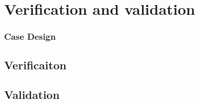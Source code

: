 \section{Verification and validation} %
\label{sec:verification_and_validation}
\subsubsection{Case Design} %
\label{ssub:case_design}


\subsection{Verificaiton} %
\label{sub:verificaiton}

\subsection{Validation} %
\label{sub:validation}

